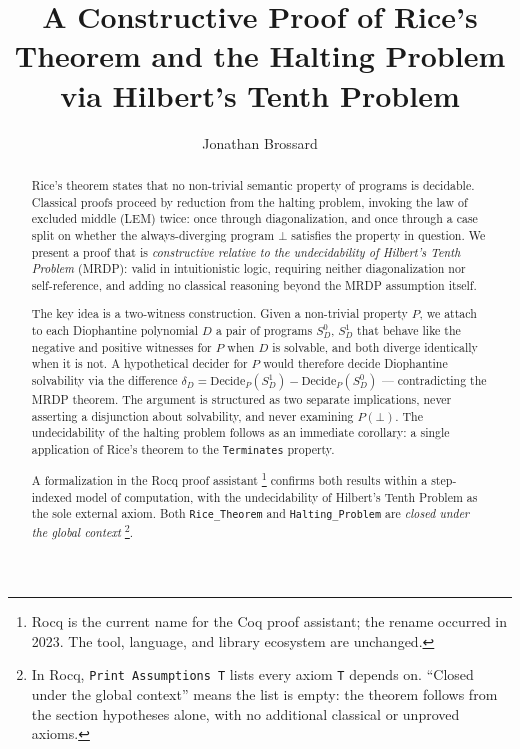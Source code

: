 \documentclass{lmcs}
\title[Constructive Rice and Halting via MRDP]{A Constructive Proof of Rice's
  Theorem and the Halting Problem via Hilbert's Tenth Problem}
\author{Jonathan Brossard\lmcsorcid{0009-0004-8031-1438}}
\begin{document}



\begin{abstract}
Rice's theorem states that no non-trivial semantic property of programs
is decidable. Classical proofs proceed by reduction from the halting
problem, invoking the law of excluded middle (LEM) twice: once through
diagonalization, and once through a case split on whether the always-diverging
program $\bot$ satisfies the property in question. We present a proof
that is \emph{constructive relative to the undecidability of Hilbert's
Tenth Problem} (MRDP): valid in intuitionistic logic, requiring neither
diagonalization nor self-reference, and adding no classical reasoning
beyond the MRDP assumption itself.

The key idea is a two-witness construction. Given a non-trivial property
$P$, we attach to each Diophantine polynomial $D$ a pair of programs
$S_D^0$, $S_D^1$ that behave like the negative and positive witnesses
for $P$ when $D$ is solvable, and both diverge identically when it is
not. A hypothetical decider for $P$ would therefore decide Diophantine
solvability via the difference $\delta_D = \mathrm{Decide}_P(S_D^1) -
\mathrm{Decide}_P(S_D^0)$ --- contradicting the MRDP theorem. The
argument is structured as two separate implications, never asserting a
disjunction about solvability, and never examining $P(\bot)$. The
undecidability of the halting problem follows as an immediate corollary:
a single application of Rice's theorem to the \texttt{Terminates}
property.

A formalization in the Rocq proof assistant%
\footnote{Rocq is the current name for the Coq proof assistant;
the rename occurred in 2023. The tool, language, and library
ecosystem are unchanged.}
confirms both results within a step-indexed model of computation, with
the undecidability of Hilbert's Tenth Problem as the sole external
axiom. Both \texttt{Rice\_Theorem} and \texttt{Halting\_Problem} are
\emph{closed under the global context}%
\footnote{In Rocq, \texttt{Print Assumptions T} lists every axiom
  \texttt{T} depends on. ``Closed under the global context'' means
  the list is empty: the theorem follows from the section hypotheses
  alone, with no additional classical or unproved axioms.}.
\end{abstract}

\maketitle
\end{document}
